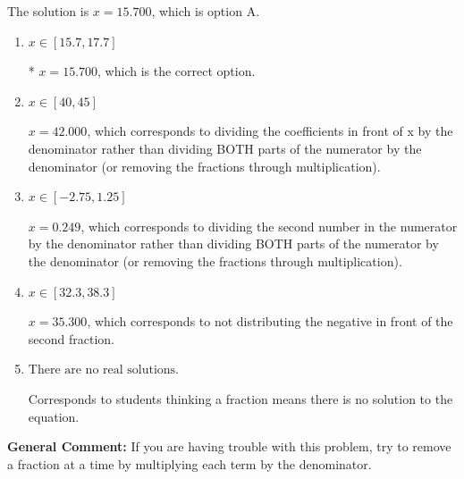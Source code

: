 \documentclass{extbook}[14pt]
\begin{document}
\begin{enumerate}
{The solution is \( x = 15.700 \), which is option A.\begin{enumerate}[label=\Alph*.]
\item \( x \in [15.7, 17.7] \)

* $x = 15.700$, which is the correct option.
\item \( x \in [40, 45] \)

 $x = 42.000$, which corresponds to dividing the coefficients in front of x by the denominator rather than dividing BOTH parts of the numerator by the denominator (or removing the fractions through multiplication).
\item \( x \in [-2.75, 1.25] \)

 $x = 0.249$, which corresponds to dividing the second number in the numerator by the denominator rather than dividing BOTH parts of the numerator by the denominator (or removing the fractions through multiplication).
\item \( x \in [32.3, 38.3] \)

 $x = 35.300$, which corresponds to not distributing the negative in front of the second fraction.
\item \( \text{There are no real solutions.} \)

Corresponds to students thinking a fraction means there is no solution to the equation.
\end{enumerate}

\textbf{General Comment:} If you are having trouble with this problem, try to remove a fraction at a time by multiplying each term by the denominator.
}
\end{enumerate}
\end{document}
